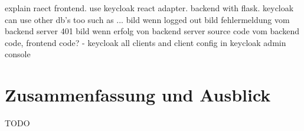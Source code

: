 explain raect frontend. use keycloak react adapter. backend with flask. keycloak can use other db's too such as ...
bild wenn logged out
bild fehlermeldung vom backend server 401
bild wenn erfolg von backend server
source code vom backend code, frontend code?
- keycloak all clients and client config in keycloak admin console

\section{Zusammenfassung und Ausblick}

TODO




